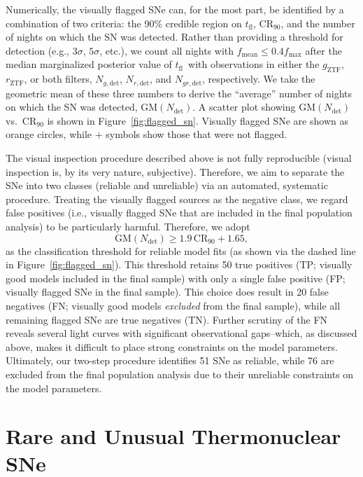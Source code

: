 \documentclass[twocolumn]{./aastex63}
\newcommand{\rztf}{$r_\mathrm{ZTF}$}
\newcommand{\gztf}{$g_\mathrm{ZTF}$}
\newcommand{\tfl}{$t_\mathrm{fl}$}
\begin{document}
Numerically, the visually flagged SNe can, for the most part, be identified
by a combination of two criteria: the 90\% credible region on \tfl,
$\mathrm{CR}_{90}$, and the number of nights on which the SN was detected.
Rather than providing a threshold for detection (e.g., $3\sigma$, $5\sigma$,
etc.), we count all nights with $f_\mathrm{mean} \le 0.4 f_\mathrm{max}$
after the median marginalized posterior value of \tfl\ with observations in
either the \gztf, \rztf, or both filters, $N_{g, \mathrm{det}}$, $N_{r,
\mathrm{det}}$, and $N_{gr, \mathrm{det}}$, respectively. We take the
geometric mean of these three numbers to derive the ``average'' number of
nights on which the SN was detected, $\mathrm{GM}(N_\mathrm{det})$. A scatter
plot showing $\mathrm{GM}(N_\mathrm{det})$ vs.\ $\mathrm{CR}_{90}$ is shown
in Figure~\ref{fig:flagged_sn}. Visually flagged SNe are shown as orange
circles, while $+$ symbols show those that were not flagged.

The visual inspection procedure described above is not fully reproducible
(visual inspection is, by its very nature, subjective). Therefore, we aim to
separate the SNe into two classes (reliable and unreliable) via an automated,
systematic procedure. Treating the visually flagged sources as the negative
class, we regard false positives (i.e., visually flagged SNe that are included
in the final population analysis) to be particularly harmful. Therefore, we adopt
%
$$ \mathrm{GM}(N_\mathrm{det}) \ge 1.9\,\mathrm{CR}_{90} + 1.65,$$
%
as the classification threshold for reliable model fits (as shown via the
dashed line in Figure~\ref{fig:flagged_sn}). This threshold retains 50 true
positives (TP; visually good models included in the final sample) with only a
single false positive (FP; visually flagged SNe in the final sample). This
choice does result in 20 false negatives (FN; visually good models
\textit{excluded} from the final sample), while all remaining flagged SNe are
true negatives (TN). Further scrutiny of the FN reveals several light curves
with significant observational gaps--which, as discussed above, makes it
difficult to place strong constraints on the model parameters. Ultimately, our
two-step procedure identifies 51 SNe as reliable, while 76 are excluded from
the final population analysis due to their unreliable constraints on the model
parameters.

\section{Rare and Unusual Thermonuclear SNe}\label{sec:rare}
\end{document}
